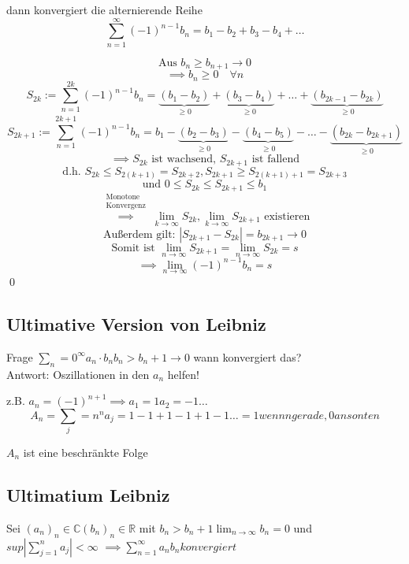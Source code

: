 \documentclass[fleqn]{scrbook}
\newcommand{\R}{\mathbb{R}}
\newcommand{\sumOI}{\sum_{n=1}^{\infty}}
\renewenvironment{proof}{{\bfseries Beweis }}{\qed}
\begin{document}
dann konvergiert die alternierende Reihe
\[\sumOI (-1)^{n-1} b_n = b_1-b_2+b_3-b_4+\ldots \]

\begin{proof}
 \[\text{Aus } b_n \geq b_{n+1} \to 0\]
 \[\implies b_n \geq 0 \quad \forall n\]
 \[S_{2k}:=\sum_{n=1}^{2k} (-1)^{n-1} b_n = \underbrace{(b_1-b_2)}_{\geq 0}+\underbrace{(b_3-b_4)}_{\geq 0}+\ldots+\underbrace{(b_{2k-1}-b_{2k})}_{\geq 0}\]
 \[S_{2k+1}:=\sum_{n=1}^{2k+1} (-1)^{n-1} b_n = b_1 - \underbrace{(b_2-b_3)}_{\geq 0}-\underbrace{(b_4-b_5)}_{\geq 0}-\ldots-\underbrace{(b_{2k}-b_{2k+1})}_{\geq 0}\]
 \[\implies S_{2k} \text{ ist wachsend, } S_{2k+1} \text{ ist fallend}\]
 \[\text{d.h. } S_{2k} \leq S_{2(k+1)} = S_{2k+2}, S_{2k+1} \geq S_{2(k+1)+1} = S_{2k+3}\]
 \[\text{und } 0\leq S_{2k} \leq S_{2k+1} \leq b_1\]
 \[\stackrel{\begin{array}{l}\text{Monotone}\\\text{Konvergenz}\end{array}}{\implies} \lim_{k \to \infty} S_{2k}, \lim_{k \to \infty} S_{2k+1} \text{ existieren} \]
 \[\text{Außerdem gilt: } |S_{2k+1}-S_{2k}|=b_{2k+1} \to 0\]
 \[\text{Somit ist } \lim_{n\to \infty} S_{2k+1} = \lim_{n\to \infty} S_{2k} = s\]
 \[\implies \lim_{n \to \infty} (-1)^{n-1} b_n=s\] 
\end{proof}

\subsection{Ultimative Version von Leibniz}
Frage $\sum_n=0^{\infty} a_n \cdot b_n b_n > b_n+1 \to 0$ wann konvergiert das? \\
Antwort: Oszillationen in den $a_n$ helfen!

z.B. $a_n = (-1)^{n+1} \implies a_1 = 1 a_2 = -1 \ldots $
$$A_n = \sum_j=n^{n} a_j = 1-1+1-1+1-1 \ldots = 1 wenn n gerade, 0 ansonten$$

$A_n$ ist eine beschränkte Folge

\subsection{Ultimatium Leibniz}
Sei $(a_n)_n \in \mathbb{C} (b_n)_n \in \R$ mit $b_n > b_n+1 \lim_{n \to \infty} b_{n} = 0 $ und $sup | \sum_{j=1}^{n} a_j| < \infty$
$\implies  \sumOI a_n b_n konvergiert$
\end{document}
